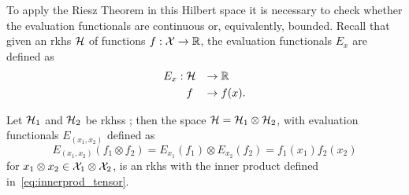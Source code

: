 To apply the Riesz Theorem in this Hilbert space it is necessary to check whether the evaluation functionals are continuous or, equivalently, bounded.
Recall that given an \acrshort{rkhs} $\mathcal{H}$ of functions $f: \mathcal{X} \to \mathbb{R}$, the evaluation functionals $E_{x}$ are defined as
\begin{equation}
    \nonumber
    \begin{aligned}
        E_x :\; & \mathcal{H} &\to & \; \mathbb{R} \\
          & f     &\to & \; f(x) .
    \end{aligned}
\end{equation} 
%
\begin{proposition}\label{prop:bounded_tensorfun}
    Let $\mathcal{H}_1$ and $\mathcal{H}_2$ be \acrshort{rkhss} ; then
    the space $\mathcal{H} = \mathcal{H}_1 \otimes \mathcal{H}_2$, with evaluation functionals $E_{(x_1, x_2)} $ defined as
    $$E_{(x_1, x_2)} (f_1 \otimes f_2) =E_{x_1}(f_1) \otimes E_{x_2}(f_2) = f_1(x_1) f_2(x_2)$$
    for $x_1 \otimes x_2 \in \mathcal{X}_1 \otimes \mathcal{X}_2$,
    is an \acrshort{rkhs} with the inner product defined in~\eqref{eq:innerprod_tensor}.
\end{proposition}
